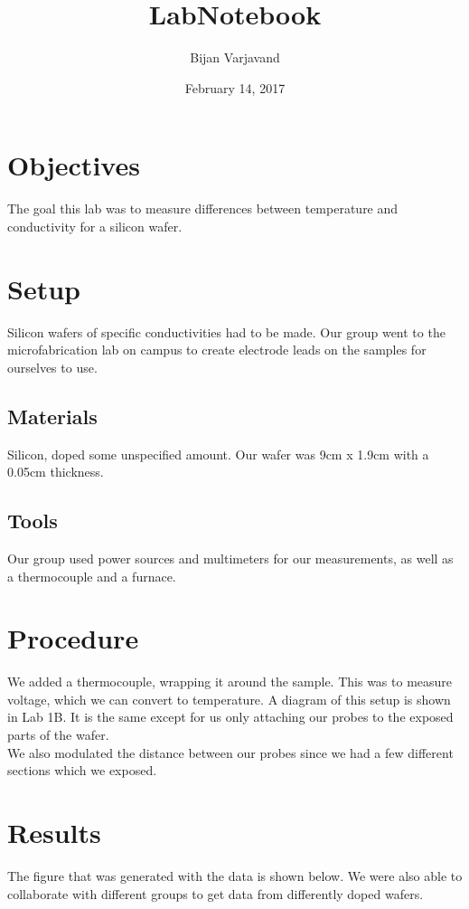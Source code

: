 \documentclass{article}
\author{Bijan Varjavand}
\title{LabNotebook}
\date{February 14, 2017}
\begin{document}
\maketitle

\section{Objectives}

The goal this lab was to measure differences between temperature and conductivity for a silicon wafer.

\section{Setup}

Silicon wafers of specific conductivities had to be made. Our group went to the microfabrication lab on campus to create electrode leads on the samples for ourselves to use.
\subsection{Materials}

Silicon, doped some unspecified amount. Our wafer was 9cm x 1.9cm with a 0.05cm thickness.
\subsection{Tools}

Our group used power sources and multimeters for our measurements, as well as a thermocouple and a furnace.
\section{Procedure}

We added a thermocouple, wrapping it around the sample. This was to measure voltage, which we can convert to
temperature. A diagram of this setup is shown in Lab 1B. It is the same except for us only attaching our probes to the exposed parts of the wafer.\\

We also modulated the distance between our probes since we had a few different sections which we exposed.

\section{Results}

The figure that was generated with the data is shown below. We were also able to collaborate with different groups to get data from differently doped wafers.
\end{document}
